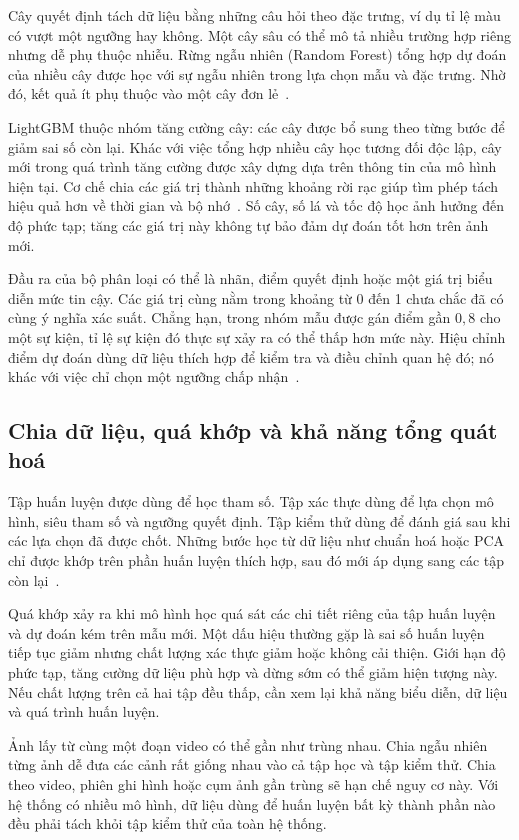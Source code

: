 Cây quyết định tách dữ liệu bằng những câu hỏi theo đặc trưng, ví dụ tỉ lệ màu có vượt một ngưỡng hay không. Một cây sâu có thể mô tả nhiều trường hợp riêng nhưng dễ phụ thuộc nhiễu. Rừng ngẫu nhiên (Random Forest) tổng hợp dự đoán của nhiều cây được học với sự ngẫu nhiên trong lựa chọn mẫu và đặc trưng. Nhờ đó, kết quả ít phụ thuộc vào một cây đơn lẻ~\cite{sklearn_ensemble}.

LightGBM thuộc nhóm tăng cường cây: các cây được bổ sung theo từng bước để giảm sai số còn lại. Khác với việc tổng hợp nhiều cây học tương đối độc lập, cây mới trong quá trình tăng cường được xây dựng dựa trên thông tin của mô hình hiện tại. Cơ chế chia các giá trị thành những khoảng rời rạc giúp tìm phép tách hiệu quả hơn về thời gian và bộ nhớ~\cite{ke2017lightgbm,lightgbm_features}. Số cây, số lá và tốc độ học ảnh hưởng đến độ phức tạp; tăng các giá trị này không tự bảo đảm dự đoán tốt hơn trên ảnh mới.

Đầu ra của bộ phân loại có thể là nhãn, điểm quyết định hoặc một giá trị biểu diễn mức tin cậy. Các giá trị cùng nằm trong khoảng từ 0 đến 1 chưa chắc đã có cùng ý nghĩa xác suất. Chẳng hạn, trong nhóm mẫu được gán điểm gần $0{,}8$ cho một sự kiện, tỉ lệ sự kiện đó thực sự xảy ra có thể thấp hơn mức này. Hiệu chỉnh điểm dự đoán dùng dữ liệu thích hợp để kiểm tra và điều chỉnh quan hệ đó; nó khác với việc chỉ chọn một ngưỡng chấp nhận~\cite{sklearn_calibration}.

\subsection{Chia dữ liệu, quá khớp và khả năng tổng quát hoá}
Tập huấn luyện được dùng để học tham số. Tập xác thực dùng để lựa chọn mô hình, siêu tham số và ngưỡng quyết định. Tập kiểm thử dùng để đánh giá sau khi các lựa chọn đã được chốt. Những bước học từ dữ liệu như chuẩn hoá hoặc PCA chỉ được khớp trên phần huấn luyện thích hợp, sau đó mới áp dụng sang các tập còn lại~\cite{sklearn_pitfalls}.

Quá khớp xảy ra khi mô hình học quá sát các chi tiết riêng của tập huấn luyện và dự đoán kém trên mẫu mới. Một dấu hiệu thường gặp là sai số huấn luyện tiếp tục giảm nhưng chất lượng xác thực giảm hoặc không cải thiện. Giới hạn độ phức tạp, tăng cường dữ liệu phù hợp và dừng sớm có thể giảm hiện tượng này. Nếu chất lượng trên cả hai tập đều thấp, cần xem lại khả năng biểu diễn, dữ liệu và quá trình huấn luyện.

Ảnh lấy từ cùng một đoạn video có thể gần như trùng nhau. Chia ngẫu nhiên từng ảnh dễ đưa các cảnh rất giống nhau vào cả tập học và tập kiểm thử. Chia theo video, phiên ghi hình hoặc cụm ảnh gần trùng sẽ hạn chế nguy cơ này. Với hệ thống có nhiều mô hình, dữ liệu dùng để huấn luyện bất kỳ thành phần nào đều phải tách khỏi tập kiểm thử của toàn hệ thống.

